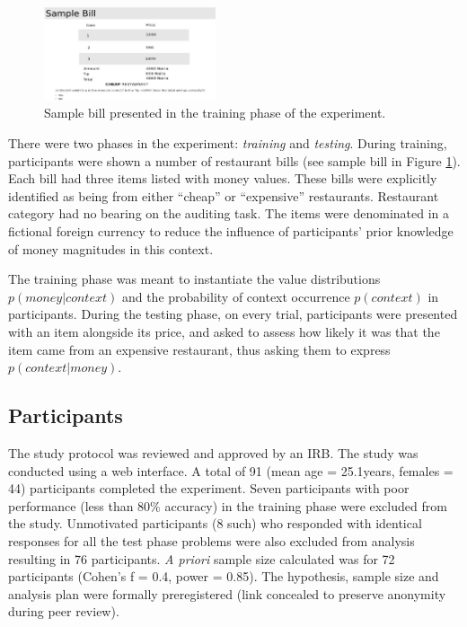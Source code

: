 \documentclass[10pt,letterpaper]{article}
\begin{document}
\begin{figure}[htbp]
	\centering
	\includegraphics[width=0.45\textwidth]{results/sample-bill.JPG}
	\caption{Sample bill presented in the training phase of the experiment.}
	\label{fig:design}
\end{figure}

There were two phases in the experiment: {\em training} and {\em testing}. During training, participants were shown a number of restaurant bills (see sample bill in Figure \ref{fig:design}). Each bill had three items listed with money values. These bills were explicitly identified as being from either “cheap” or “expensive” restaurants. Restaurant category had no bearing on the auditing task. The items were denominated in a fictional foreign currency to reduce the influence of participants' prior knowledge of money magnitudes in this context. 

The training phase was meant to instantiate the value distributions $p(money|context)$ and the probability of context occurrence $p(context)$ in participants. During the testing phase, on every trial, participants were presented with an item alongside its price, and asked to assess how likely it was that the item came from an expensive restaurant, thus asking them to express $p(context|money)$.


\subsection{Participants}
The study protocol was reviewed and approved by an IRB. The study was conducted using a web interface. A total of 91 (mean age = 25.1years, females = 44) participants completed the experiment. Seven participants with poor performance (less than 80\% accuracy) in the training phase were excluded from the study. Unmotivated participants (8 such) who responded with identical responses for all the test phase problems were also excluded from analysis resulting in 76 participants. {\em A priori} sample size calculated was for 72 participants (Cohen’s f = 0.4, power = 0.85). The hypothesis, sample size and analysis plan were formally preregistered (link concealed to preserve anonymity during peer review). 
\end{document}
